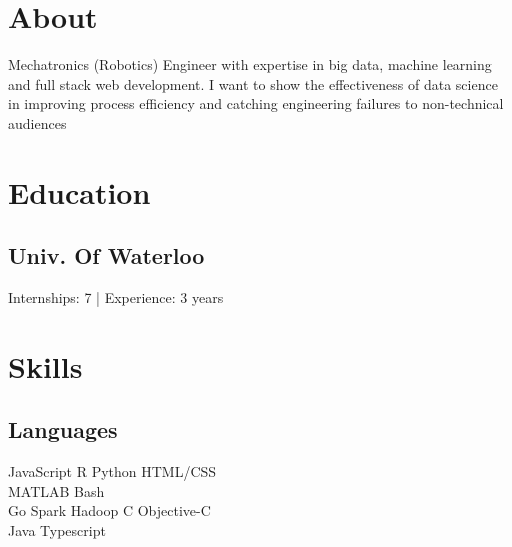 \documentclass[]{deedy-resume-openfont}
\begin{document}
%
%

%
%



%
%

\begin{minipage}[t]{0.33\textwidth}


\section{About}
Mechatronics (Robotics) Engineer with expertise in big data, machine learning
and full stack web development. I want to show the effectiveness of data science
in improving process efficiency and catching engineering failures to
non-technical audiences
 

\section{Education}

\subsection{Univ. Of Waterloo}
Internships: 7 | Experience: 3 years \\
\sectionsep



\section{Skills}
\subsection{Languages}
JavaScript \textbullet{} R \textbullet{} Python \textbullet{} HTML/CSS \\
MATLAB \textbullet{} Bash\\
Go \textbullet{} Spark \textbullet{} Hadoop \textbullet{} C \textbullet{} Objective-C \\
Java \textbullet{} Typescript\\
\sectionsep


\end{minipage}
\end{document}
